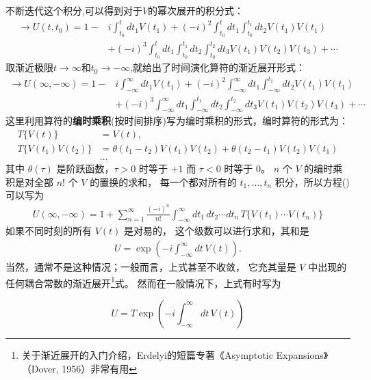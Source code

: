  不断迭代这个积分,可以得到对于$V$的幂次展开的积分式：
\[    \begin{aligned}
        \rightarrow U(t,t_0)=1-&i\int^{t}_{t_0}dt_1V(t_1)+(-i)^2\int^{t}_{t_0}dt_1\int_{t_0}^{t_1}dt_2V(t_1)V(t_1)\\
        &+(-i)^3\int^{t}_{t_0}dt_1\int^{t_1}_{t_0}dt_2\int^{t_2}_{t_0}dt_3V(t_1)V(t_2)V(t_3)+\cdots
    \end{aligned}\]
取渐近极限$t\rightarrow\infty$和$t_0\rightarrow-\infty$,就给出了时间演化算符的渐近展开形式：
\begin{equation}\label{dyson}
    \begin{aligned}
        \rightarrow U(\infty,-\infty)=1-&i\int^{\infty}_{-\infty}dt_1V(t_1)+(-i)^2\int^{\infty}_{-\infty}dt_1\int_{-\infty}^{t_1}dt_2V(t_1)V(t_1)\\
        &+(-i)^3\int^{\infty}_{-\infty}dt_1\int^{t_1}_{-\infty}dt_2\int^{t_2}_{-\infty}dt_3V(t_1)V(t_2)V(t_3)+\cdots
    \end{aligned}
\end{equation}
这里利用算符的\textbf{编时乘积}(按时间排序)写为编时乘积的形式，编时算符的形式为：
\[
\begin{aligned}
T\{V(t)\} &= V(t), \\
T\{V(t_1)V(t_2)\} &= \theta(t_1-t_2)V(t_1)V(t_2)
+ \theta(t_2-t_1)V(t_2)V(t_1)\\
&\ldots
\end{aligned}
\]
其中 $\theta(\tau)$ 是阶跃函数，$\tau>0$ 时等于 $+1$ 而 $\tau<0$ 时等于 $0$。
$n$ 个 $V$ 的编时乘积是对全部 $n!$ 个 $V$ 的置换的求和，
每一个都对所有的 $t_1,\ldots,t_n$ 积分，所以方程()可以写为
\begin{equation*}
    \begin{aligned}
        U(\infty,-\infty)
        = 1 + \sum_{n=1}^{\infty} \frac{(-i)^n}{n!}
        \int_{-\infty}^{\infty} dt_1\,dt_2 \cdots dt_n\,
        T\{V(t_1)\cdots V(t_n)\}
\end{aligned}
\end{equation*}
如果不同时刻的所有 $V(t)$ 是对易的，
这个级数可以进行求和，其和是
\[
\begin{aligned}
U = \exp\!\left(-i\int_{-\infty}^{\infty} dt\,V(t)\right).
\end{aligned}
\]
当然，通常不是这种情况；一般而言，上式甚至不收敛，
它充其量是 $V$ 中出现的任何耦合常数的渐近展开\footnote{关于渐近展开的入门介绍，Erdelyi的短篇专著《Asymptotic Expansions》（Dover, 1956）非常有用}式。
然而在一般情况下，上式有时写为


    \begin{equation}
        U = T \exp\!\left(-i\int_{-\infty}^{\infty} dt\,V(t)\right)   
\end{equation}

